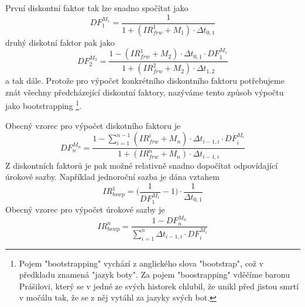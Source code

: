 \documentclass[a4paper]{book}
\begin{document}
První diskontní faktor tak lze snadno spočítat jako
\begin{equation*}
DF^{M_1}_1 = \frac{1}{1+(IR_{frw}^1 + M_1) \cdot \Delta t_{0,1}}
\end{equation*}
druhý diskotní faktor pak jako
\begin{equation*}
DF^{M_2}_2 = \frac{1-(IR_{frw}^1 + M_2)\cdot \Delta t_{0,1} \cdot DF^{M_1}_{1}}{1+(IR_{frw}^2 + M_2) \cdot \Delta t_{1,2}}
\end{equation*}
a tak dále. Protože pro výpočet konkrétního diskontního faktoru potřebujeme znát všechny předcházející diskontní faktory, nazýváme tento způsob výpočtu jako bootstrapping \footnote{Pojem "bootstrapping" vychází z anglického slova "bootstrap", což v předkladu znamená "jazyk boty". Za pojem "boostrapping" vděčíme baronu Prášilovi, který se v jedné ze svých historek chlubil, že unikl před jistou smrtí v močálu tak, že se z něj vytáhl za jazyky svých bot.}.

Obecný vzorec pro výpočet diskotního faktoru je
\begin{equation*}
DF^{M_n}_n = \frac{1-\sum^{n-1}_{i=1}(IR_{frw}^i + M_n) \cdot \Delta t_{i-1,i} \cdot DF^{M_i}_i}{1+(IR_{frw}^n + M_n) \cdot \Delta t_{i-1,i}}
\end{equation*}
Z diskontních faktorů je pak možné relativně snadno dopočítat odpovídající úrokové sazby. Například jednoroční sazba je dána vztahem
\begin{equation*}
IR_{bswp}^1 = \Bigg( \frac{1}{DF^{M_1}_1} - 1 \Bigg) \cdot \frac{1}{\Delta t_{0,1}}
\end{equation*}
Obecný vzorec pro výpočet úrokové sazby je
\begin{equation*}
IR_{bswp}^n = \frac{1-DF^{M_n}_n}{\sum^n_{i=1}\Delta t_{i-1,i} \cdot DF^{M_i}_i}
\end{equation*}
\end{document}
